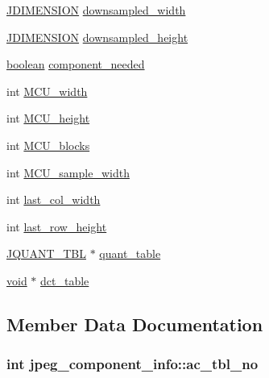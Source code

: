 \begin{DoxyCompactItemize}
\item 
\hyperlink{jmorecfg_8h_a04ed4674f6f1d0d50ec241531e38274f}{J\+D\+I\+M\+E\+N\+S\+I\+O\+N} \hyperlink{structjpeg__component__info_aacbe6c10eca470c8ec331f91be8cccee}{downsampled\+\_\+width}
\item 
\hyperlink{jmorecfg_8h_a04ed4674f6f1d0d50ec241531e38274f}{J\+D\+I\+M\+E\+N\+S\+I\+O\+N} \hyperlink{structjpeg__component__info_a019811f4bcc16fe481e0b53f659b281e}{downsampled\+\_\+height}
\item 
\hyperlink{jmorecfg_8h_a7c6368b321bd9acd0149b030bb8275ed}{boolean} \hyperlink{structjpeg__component__info_a8f9efa098849cd087e20d536b05d4798}{component\+\_\+needed}
\item 
int \hyperlink{structjpeg__component__info_a82a5bababd81410839aefec8a61878de}{M\+C\+U\+\_\+width}
\item 
int \hyperlink{structjpeg__component__info_a09baec129e44114d46d5b19dc98b0105}{M\+C\+U\+\_\+height}
\item 
int \hyperlink{structjpeg__component__info_ad9b901306395808c7eb338148e30c2cd}{M\+C\+U\+\_\+blocks}
\item 
int \hyperlink{structjpeg__component__info_aca7e52dcd78bb2fe51104e2add9dade5}{M\+C\+U\+\_\+sample\+\_\+width}
\item 
int \hyperlink{structjpeg__component__info_a440612272e3e9eac0a240fd34cde5bbe}{last\+\_\+col\+\_\+width}
\item 
int \hyperlink{structjpeg__component__info_a7d0738ae3647a019722410a2d718f3d3}{last\+\_\+row\+\_\+height}
\item 
\hyperlink{structJQUANT__TBL}{J\+Q\+U\+A\+N\+T\+\_\+\+T\+B\+L} $\ast$ \hyperlink{structjpeg__component__info_afd551e8e9dbc3f3076c10cd4d391fdac}{quant\+\_\+table}
\item 
\hyperlink{png_8h_aa8c59027f9ab2769342f248709d68d17}{void} $\ast$ \hyperlink{structjpeg__component__info_a9f68a39fc17561866668c1b9d4a8f238}{dct\+\_\+table}
\end{DoxyCompactItemize}


\subsection{Member Data Documentation}
\hypertarget{structjpeg__component__info_adfea67573a39b232c3d82ac808539a83}{}
\subsubsection[{ac\+\_\+tbl\+\_\+no}]{\setlength{\rightskip}{0pt plus 5cm}int jpeg\+\_\+component\+\_\+info\+::ac\+\_\+tbl\+\_\+no}\label{structjpeg__component__info_adfea67573a39b232c3d82ac808539a83}
\hypertarget{structjpeg__component__info_a205782ff7ec47c58cb470f121247ea8d}{}
